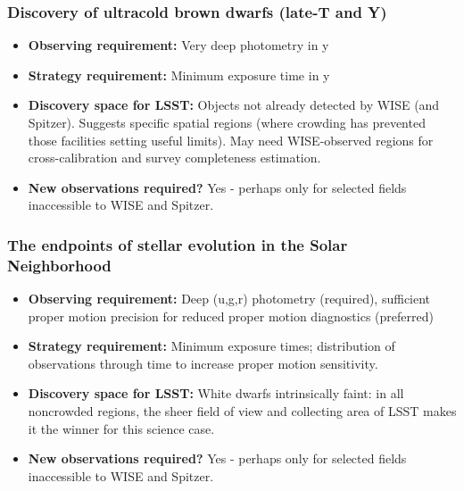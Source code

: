 \subsubsection{Discovery of ultracold brown dwarfs (late-T and Y)}
\vspace{-2mm}
\begin{itemize}
\item {\bf Observing requirement:} Very deep photometry in y \vspace{-2mm}
\item {\bf Strategy requirement:} Minimum exposure time in y \vspace{-2mm}
\item {\bf Discovery space for LSST:} Objects not already detected by WISE (and Spitzer). Suggests specific spatial regions (where crowding has prevented those facilities setting useful limits). May need WISE-observed regions for cross-calibration and survey completeness estimation. \vspace{-2mm}
\item {\bf New observations required?} Yes - perhaps only for selected fields inaccessible to WISE and Spitzer.
\end{itemize}

\subsubsection{The endpoints of stellar evolution in the Solar Neighborhood}
\vspace{-2mm}
\begin{itemize}
\item {\bf Observing requirement:} Deep (u,g,r) photometry (required), sufficient proper motion precision for reduced proper motion diagnostics (preferred)
\vspace{-2mm}
\item {\bf Strategy requirement:} Minimum exposure times; distribution of observations through time to increase proper motion sensitivity.
\vspace{-2mm}
\item {\bf Discovery space for LSST:} White dwarfs intrinsically faint: in all noncrowded regions, the sheer field of view and collecting area of LSST makes it the winner for this science case.
\vspace{-2mm}
\item {\bf New observations required?} Yes - perhaps only for selected fields inaccessible to WISE and Spitzer.
\end{itemize}


